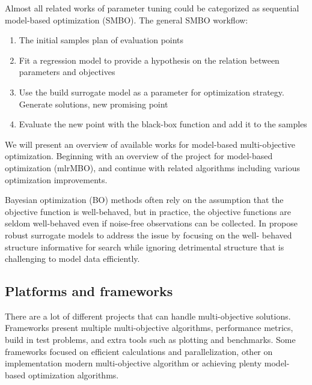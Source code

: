         Almost all related works of parameter tuning could be categorized as sequential model-based optimization (SMBO)\cite{JonesSW98}.
        The general SMBO workflow:
        \begin{enumerate}
            \item The initial samples plan of evaluation points
            \item Fit a regression model to provide a hypothesis on the relation between parameters and objectives
            \item Use the build surrogate model as a parameter for optimization strategy. Generate solutions, new promising point
            \item Evaluate the new point with the black-box function and add it to the samples
        \end{enumerate}
        We will present an overview of available works for model-based multi-objective optimization. Beginning with an overview of the project for model-based optimization (mlrMBO), and continue with related algorithms including various optimization improvements.




    Bayesian optimization (BO) methods often rely on the assumption that the objective function is well-behaved, but in practice, the objective functions are seldom well-behaved even if noise-free observations can be collected. In \cite{bodin2019modulating} propose robust surrogate models to address the issue by focusing on the well- behaved structure informative for search while ignoring detrimental structure that is challenging to model data efficiently.


    \subsection{Platforms and frameworks}
        There are a lot of different projects that can handle multi-objective solutions. Frameworks present multiple multi-objective algorithms, performance metrics, build in test problems, and extra tools such as plotting and benchmarks. Some frameworks focused on efficient calculations and parallelization\cite{francesco_biscani_2019}, other on implementation modern multi-objective algorithm\cite{benitezhidalgo2019jmetalpy, TianPlatEMO} or achieving plenty model-based optimization algorithms\cite{BischlmlrMBO}. 

